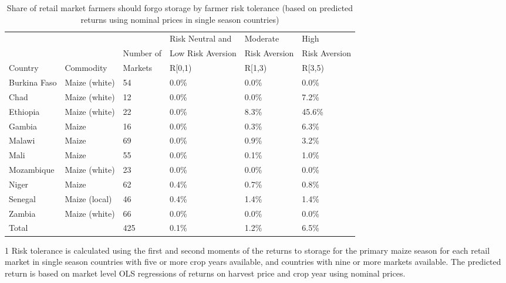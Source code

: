 \begin{table}[ht]
	\begin{threeparttable}[t]
		\centering
		\caption{Share of retail market farmers should forgo storage by farmer risk tolerance (based on predicted returns using nominal prices in single season countries)}
		\label{tab:risk_return_pred}
		\begin{tabular}{|lll|lll|}
			\hline 
			&  & & Risk Neutral and & Moderate & High \\ 
			& & Number of  & Low Risk Aversion & Risk Aversion &  Risk Aversion\\ 
			Country & Commodity& Markets& R\in[0,1) &  R\in[1,3) & R\in[3,5) \\
			\hline
Burkina Faso & Maize (white) & 54 & 0.0\% & 0.0\% & 0.0\% \\ 
  Chad & Maize (white) & 12 & 0.0\% & 0.0\% & 7.2\% \\ 
  Ethiopia & Maize (white) & 22 & 0.0\% & 8.3\% & 45.6\% \\ 
  Gambia & Maize & 16 & 0.0\% & 0.3\% & 6.3\% \\ 
  Malawi & Maize & 69 & 0.0\% & 0.9\% & 3.2\% \\ 
  Mali & Maize & 55 & 0.0\% & 0.1\% & 1.0\% \\ 
  Mozambique & Maize (white) & 23 & 0.0\% & 0.0\% & 0.0\% \\ 
  Niger & Maize & 62 & 0.4\% & 0.7\% & 0.8\% \\ 
  Senegal & Maize (local) & 46 & 0.4\% & 1.4\% & 1.4\% \\ 
  Zambia & Maize (white) & 66 & 0.0\% & 0.0\% & 0.0\% \\ 
      \hline
  Total &  & 425 & 0.1\% & 1.2\% & 6.5\% \\ 
  \hline 
\end{tabular}
\begin{tablenotes}
\item [1] \footnotesize Risk tolerance is calculated using the first and second moments of the returns to storage for the primary maize season for each retail market in single season countries with five or more crop years available, and countries with nine or more markets available. The predicted return is based on market level OLS regressions of returns on harvest price and crop year using nominal prices.
\end{tablenotes}
\end{threeparttable}
\end{table}
